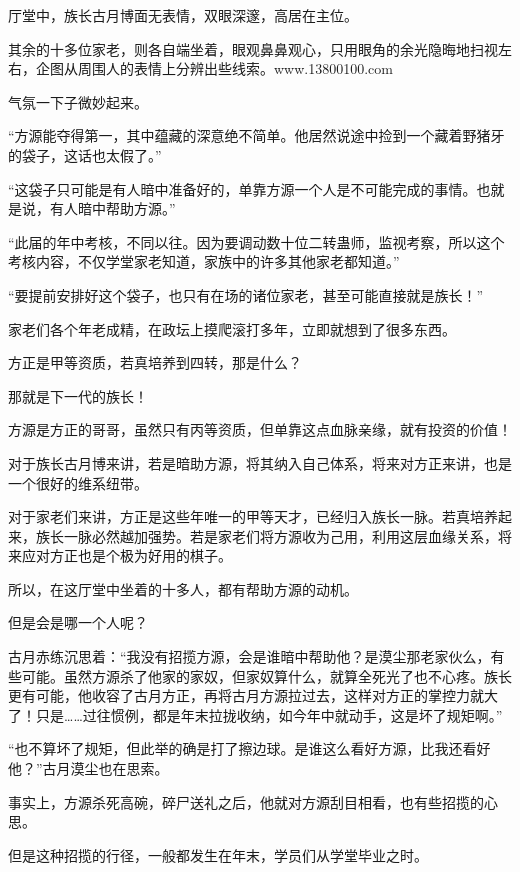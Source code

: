 
\begin{this_body}

厅堂中，族长古月博面无表情，双眼深邃，高居在主位。

其余的十多位家老，则各自端坐着，眼观鼻鼻观心，只用眼角的余光隐晦地扫视左右，企图从周围人的表情上分辨出些线索。www.13800100.com

气氛一下子微妙起来。

“方源能夺得第一，其中蕴藏的深意绝不简单。他居然说途中捡到一个藏着野猪牙的袋子，这话也太假了。”

“这袋子只可能是有人暗中准备好的，单靠方源一个人是不可能完成的事情。也就是说，有人暗中帮助方源。”

“此届的年中考核，不同以往。因为要调动数十位二转蛊师，监视考察，所以这个考核内容，不仅学堂家老知道，家族中的许多其他家老都知道。”

“要提前安排好这个袋子，也只有在场的诸位家老，甚至可能直接就是族长！”

家老们各个年老成精，在政坛上摸爬滚打多年，立即就想到了很多东西。

方正是甲等资质，若真培养到四转，那是什么？

那就是下一代的族长！

方源是方正的哥哥，虽然只有丙等资质，但单靠这点血脉亲缘，就有投资的价值！

对于族长古月博来讲，若是暗助方源，将其纳入自己体系，将来对方正来讲，也是一个很好的维系纽带。

对于家老们来讲，方正是这些年唯一的甲等天才，已经归入族长一脉。若真培养起来，族长一脉必然越加强势。若是家老们将方源收为己用，利用这层血缘关系，将来应对方正也是个极为好用的棋子。

所以，在这厅堂中坐着的十多人，都有帮助方源的动机。

但是会是哪一个人呢？

古月赤练沉思着：“我没有招揽方源，会是谁暗中帮助他？是漠尘那老家伙么，有些可能。虽然方源杀了他家的家奴，但家奴算什么，就算全死光了也不心疼。族长更有可能，他收容了古月方正，再将古月方源拉过去，这样对方正的掌控力就大了！只是……过往惯例，都是年末拉拢收纳，如今年中就动手，这是坏了规矩啊。”

“也不算坏了规矩，但此举的确是打了擦边球。是谁这么看好方源，比我还看好他？”古月漠尘也在思索。

事实上，方源杀死高碗，碎尸送礼之后，他就对方源刮目相看，也有些招揽的心思。

但是这种招揽的行径，一般都发生在年末，学员们从学堂毕业之时。


\end{this_body}
